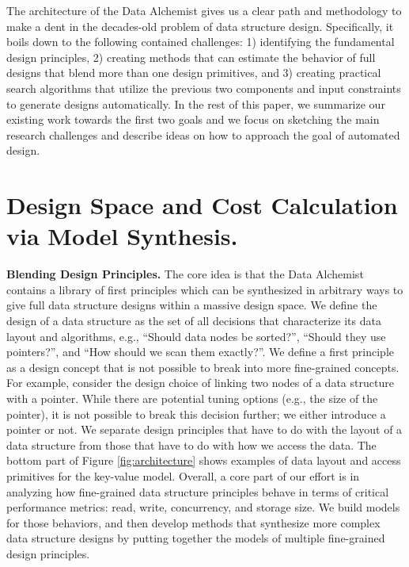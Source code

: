 \documentclass[11pt]{article}
\begin{document}
The architecture of the Data Alchemist gives us a clear path and methodology to make a dent in the decades-old problem of data structure design. Specifically, it boils down to the following contained challenges: 1) identifying the fundamental design principles, 2) creating methods that can estimate the behavior of full designs that blend more than one design primitives, and 3) creating practical search algorithms that utilize the previous two components and input constraints to generate designs automatically. In the rest of this paper, we summarize our existing work towards the first two goals and we focus on sketching the main research challenges and describe ideas on how to approach the goal of automated design. 

\section{Design Space and Cost Calculation via Model Synthesis.}

\textbf{Blending Design Principles.} The core idea is that the Data Alchemist contains a library of first principles which can be synthesized in arbitrary ways to give full data structure designs within a massive design space. We define the design of a data structure as the set of all decisions that characterize its data layout and algorithms, e.g., ``Should data nodes be sorted?'', ``Should they use pointers?'', and ``How should we scan them exactly?''. We define a first principle as a design concept that is not possible to break into more fine-grained concepts. For example, consider the design choice of linking two nodes of a data structure with a pointer. While there are potential tuning options (e.g., the size of the pointer), it is not possible to break this decision further; we either introduce a pointer or not. We separate design principles that have to do with the layout of a data structure from those that have to do with how we access the data. The bottom part of Figure \ref{fig:architecture} shows examples of data layout and access primitives for the key-value model.  Overall, a core part of our effort is in analyzing how fine-grained data structure principles behave in terms of critical performance metrics: read, write, concurrency, and storage size. We build models for those behaviors, and then develop methods that synthesize more complex data structure designs by putting together the models of multiple fine-grained design principles. 
\end{document}

